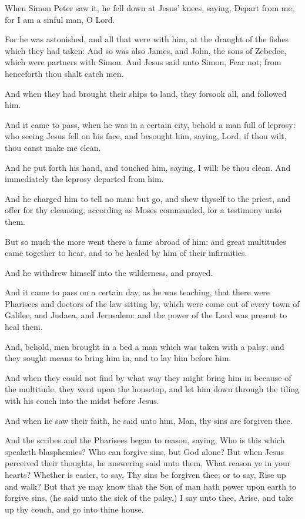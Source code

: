 \Verse When Simon Peter saw it, he fell down at Jesus' knees, saying, Depart from me; for I am a sinful man, O Lord.

\Verse For he was astonished, and all that were with him, at the draught of the fishes which they had taken: \Verse And so was also James, and John, the sons of Zebedee, which were partners with Simon. And Jesus said unto Simon, Fear not; from henceforth thou shalt catch men.

\Verse And when they had brought their ships to land, they forsook all, and followed him.

\Verse And it came to pass, when he was in a certain city, behold a man full of leprosy: who seeing Jesus fell on his face, and besought him, saying, Lord, if thou wilt, thou canst make me clean.

\Verse And he put forth his hand, and touched him, saying, I will: be thou clean. And immediately the leprosy departed from him.

\Verse And he charged him to tell no man: but go, and shew thyself to the priest, and offer for thy cleansing, according as Moses commanded, for a testimony unto them.

\Verse But so much the more went there a fame abroad of him: and great multitudes came together to hear, and to be healed by him of their infirmities.

\Verse And he withdrew himself into the wilderness, and prayed.

\Verse And it came to pass on a certain day, as he was teaching, that there were Pharisees and doctors of the law sitting by, which were come out of every town of Galilee, and Judaea, and Jerusalem: and the power of the Lord was present to heal them.

\Verse And, behold, men brought in a bed a man which was taken with a palsy: and they sought means to bring him in, and to lay him before him.

\Verse And when they could not find by what way they might bring him in because of the multitude, they went upon the housetop, and let him down through the tiling with his couch into the midst before Jesus.

\Verse And when he saw their faith, he said unto him, Man, thy sins are forgiven thee.

\Verse And the scribes and the Pharisees began to reason, saying, Who is this which speaketh blasphemies? Who can forgive sins, but God alone?  \Verse But when Jesus perceived their thoughts, he answering said unto them, What reason ye in your hearts?  \Verse Whether is easier, to say, Thy sins be forgiven thee; or to say, Rise up and walk?  \Verse But that ye may know that the Son of man hath power upon earth to forgive sins, (he said unto the sick of the palsy,) I say unto thee, Arise, and take up thy couch, and go into thine house.

